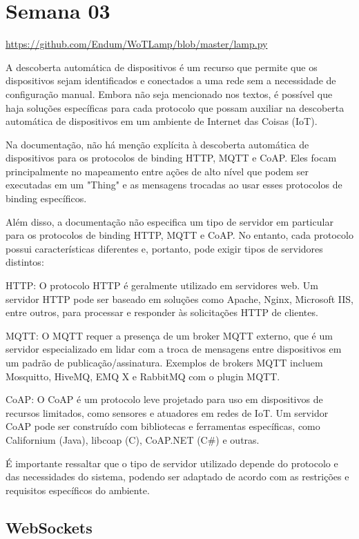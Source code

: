 
\section{Semana 03}

\url{https://github.com/Endum/WoTLamp/blob/master/lamp.py}

A descoberta automática de dispositivos é um recurso que permite que os dispositivos sejam identificados e conectados a uma rede sem a necessidade de configuração manual. Embora não seja mencionado nos textos, é possível que haja soluções específicas para cada protocolo que possam auxiliar na descoberta automática de dispositivos em um ambiente de Internet das Coisas (IoT).

Na documentação, não há menção explícita à descoberta automática de dispositivos para os protocolos de binding HTTP, MQTT e CoAP. Eles focam principalmente no mapeamento entre ações de alto nível que podem ser executadas em um "Thing" e as mensagens trocadas ao usar esses protocolos de binding específicos.

Além disso, a documentação não especifica um tipo de servidor em particular para os protocolos de binding HTTP, MQTT e CoAP. No entanto, cada protocolo possui características diferentes e, portanto, pode exigir tipos de servidores distintos:

HTTP: O protocolo HTTP é geralmente utilizado em servidores web. Um servidor HTTP pode ser baseado em soluções como Apache, Nginx, Microsoft IIS, entre outros, para processar e responder às solicitações HTTP de clientes.

MQTT: O MQTT requer a presença de um broker MQTT externo, que é um servidor especializado em lidar com a troca de mensagens entre dispositivos em um padrão de publicação/assinatura. Exemplos de brokers MQTT incluem Mosquitto, HiveMQ, EMQ X e RabbitMQ com o plugin MQTT.

CoAP: O CoAP é um protocolo leve projetado para uso em dispositivos de recursos limitados, como sensores e atuadores em redes de IoT. Um servidor CoAP pode ser construído com bibliotecas e ferramentas específicas, como Californium (Java), libcoap (C), CoAP.NET (C\#) e outras.

É importante ressaltar que o tipo de servidor utilizado depende do protocolo e das necessidades do sistema, podendo ser adaptado de acordo com as restrições e requisitos específicos do ambiente.

\subsection{WebSockets}

